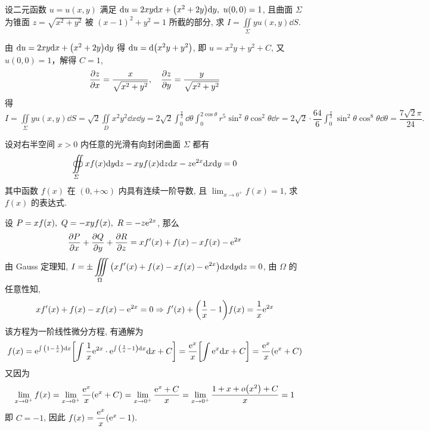 \begin{example}
    设二元函数 $u=u(x,y)$ 满足 $\dd u=2xy\dd x+\qty(x^2+2y)\dd y,~u(0,0)=1$, 且曲面 $\varSigma$ 为锥面 $z=\sqrt{x^2+y^2}$ 被 $(x-1)^2+y^2=1$ 所截的部分, 求 $\displaystyle I=\iint\limits_\varSigma yu(x,y)\dd S.$
\end{example}
\begin{solution}
    由 $\dd u=2xy\dd x+\qty(x^2+2y)\dd y$ 得 $\dd u=\dd \qty(x^2y+y^2)$, 即 $u=x^2y+y^2+C$, 又 $u(0,0)=1$，解得 $C=1$,
    $$
    \pdv{z}{x}=\dfrac{x}{\sqrt{x^2+y^2}},\quad\pdv{z}{y}=\dfrac{y}{\sqrt{x^2+y^2}}
    $$
    得 $\displaystyle I=\iint\limits_\varSigma yu(x,y)\dd S=\sqrt{2}\iint\limits_D x^2y^2\dd x\dd y=2\sqrt{2}\int_{0}^{\frac{\pi}{2}}  \dd \theta \int_{0}^{2\cos\theta} r^5\sin^2\theta\cos^2\theta \dd r=2\sqrt{2}\cdot\dfrac{64}{6}\int_{0}^{\frac{\pi}{2}} \sin^2\theta\cos^8\theta \dd \theta=\dfrac{7\sqrt{2}\pi}{24}.$
\end{solution}

\begin{example}
    设对右半空间 $x>0$ 内任意的光滑有向封闭曲面 $\varSigma$ 都有 $$\displaystyle\oiint\limits_\varSigma xf(x)\dd y\dd z-xyf(x)\dd z\dd x-z\mathrm{e}^{2x}\dd x\dd y=0$$
    其中函数 $f(x)$ 在 $(0,+\infty)$ 内具有连续一阶导数, 且 $\displaystyle\lim_{x\to0^+}f(x)=1$, 求 $f(x)$ 的表达式.
\end{example}
\begin{solution}
    设 $P=xf(x),~Q=-xyf(x),~R=-z\mathrm{e}^{2x}$, 那么 $$\pdv{P}{x}+\pdv{Q}{y}+\pdv{R}{z}=xf'(x)+f(x)-xf(x)-\mathrm{e}^{2x}$$
    由 Gauss 定理知, $\displaystyle I=\pm\iiint\limits_\Omega\qty(xf'(x)+f(x)-xf(x)-\mathrm{e}^{2x})\dd x\dd y\dd z=0$, 由 $\Omega$ 的任意性知, $$xf'(x)+f(x)-xf(x)-\mathrm{e}^{2x}=0\Rightarrow f'(x)+\qty(\dfrac{1}{x}-1)f(x)=\dfrac{1}{x}\mathrm{e}^{2x}$$
    该方程为一阶线性微分方程, 有通解为 $$f(x)=\mathrm{e}^{\int\qty(1-\frac{1}{x})\dd x}\qty[\int\dfrac{1}{x}\mathrm{e}^{2x}\cdot\mathrm{e}^{\int\qty(\frac{1}{x}-1)\dd x}\dd x+C]=\dfrac{\mathrm{e}^{x}}{x}\qty[\int\mathrm{e}^{x}\dd x+C]=\dfrac{\mathrm{e}^{x}}{x}\qty(\mathrm{e}^{x}+C)$$
    又因为 $$\displaystyle\lim_{x\to0^+}f(x)=\lim_{x\to0^+}\dfrac{\mathrm{e}^x}{x}\qty(\mathrm{e}^x+C)=\lim_{x\to0^+}\dfrac{\mathrm{e}^x+C}{x}=\lim_{x\to0^+}\dfrac{1+x+o\qty(x^2)+C}{x}=1$$ 
    即 $C=-1$, 因此 $f(x)=\dfrac{\mathrm{e}^x}{x}\qty(\mathrm{e}^x-1).$
\end{solution}

